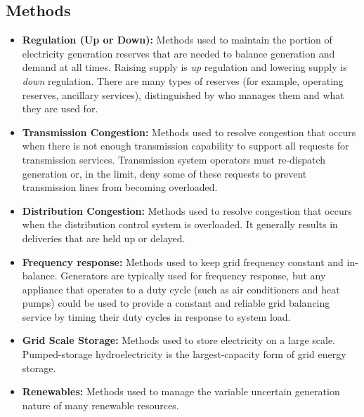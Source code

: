\subsection{Methods}
\begin{itemize}
\item {\bf Regulation (Up or Down):} Methods used to maintain the portion of electricity generation reserves 
that are needed to balance generation and demand at all times. Raising supply is \emph{up} regulation and lowering 
supply is \emph{down} regulation. There are many types of reserves (for example, operating reserves, ancillary services), distinguished by who manages them and what they are used for.

\item {\bf Transmission Congestion:} Methods used to resolve congestion that occurs when there is not enough 
transmission capability to support all requests for transmission services. Transmission system operators 
must re-dispatch generation or, 
in the limit, deny some of these requests to prevent transmission lines from becoming overloaded.

\item {\bf Distribution Congestion:}  Methods used to resolve congestion that occurs when the 
distribution control system 
is overloaded.  It generally results in deliveries that are held up or delayed.  

\item {\bf Frequency response:}  Methods used to keep grid frequency constant and in-balance. 
Generators are typically used for frequency response, but any appliance that operates to a duty cycle 
(such as air conditioners and heat pumps) could be used to provide a 
constant and reliable grid balancing service by timing their duty cycles in response to system load.   

\item {\bf Grid Scale Storage:}  Methods used to store electricity on a large scale. 
Pumped-storage hydroelectricity is the largest-capacity form of grid energy storage. 

\item {\bf Renewables:}  Methods used to manage the variable uncertain generation nature of 
many renewable resources. 
\end{itemize}

